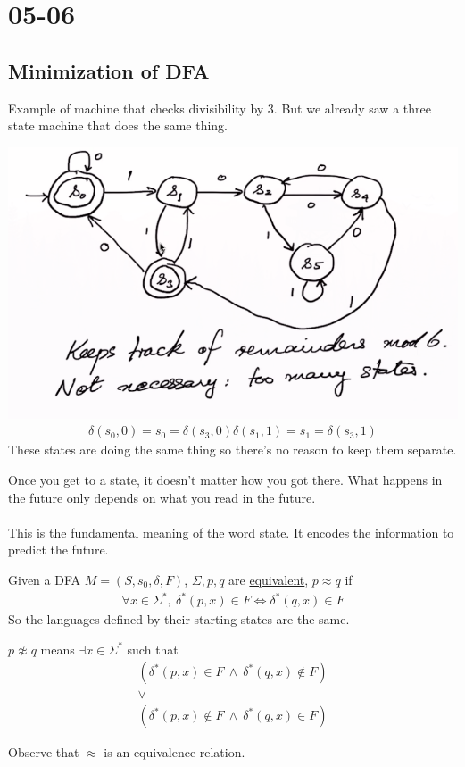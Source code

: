 \documentclass[class=scrartcl, crop=false]{standalone}
\date{2020-05-06}
\begin{document}
\section{05-06}

\subsection{Minimization of DFA}

Example of machine that checks divisibility by 3. But we already saw a three state machine that does the same thing.

\includegraphics[width=\textwidth]{mod6machine}
\begin{gather*}
  \delta(s_0, 0) = s_0 = \delta(s_3, 0)
  \delta(s_1, 1) = s_1 = \delta(s_3, 1)
\end{gather*} 
These states are doing the same thing so there's no reason to keep them separate.
\begin{note}
  Once you get to a state, it doesn't matter how you got there. What happens in the future only depends on what you read in the future.
  \\\\
  This is the fundamental meaning of the word state. It encodes the information to predict the future.
\end{note} 
\begin{definition}
  Given a DFA $M = (S, s_0, \delta, F)$, $\Sigma, p, q$ are \ul{equivalent}, $p \approx q$ if 
  \begin{gather*}
    \forall x \in \Sigma^*, \ \delta^*(p, x) \in F \Leftrightarrow \delta^*(q, x) \in F
  \end{gather*} 
  So the languages defined by their starting states are the same.
  \begin{remark}
    $p \not\approx q$ means $\exists x \in \Sigma^*$ such that 
    \begin{gather*}
      (\delta^*(p, x) \in F \ \wedge \ \delta^*(q, x) \notin F) \\
      \vee
      \\
      (\delta^*(p, x) \notin F \ \wedge \ \delta^*(q, x) \in F)
    \end{gather*} 
  \end{remark} 
  Observe that $\approx$ is an equivalence relation.
\end{definition} 
\end{document}
